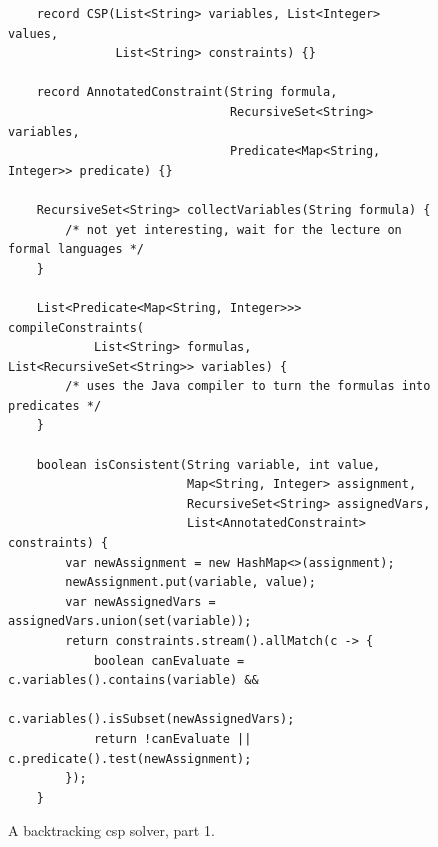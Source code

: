 \begin{figure}[!ht]
\centering
\begin{verbatim}
    record CSP(List<String> variables, List<Integer> values,
               List<String> constraints) {}

    record AnnotatedConstraint(String formula,
                               RecursiveSet<String> variables,
                               Predicate<Map<String, Integer>> predicate) {}
    
    RecursiveSet<String> collectVariables(String formula) {
        /* not yet interesting, wait for the lecture on formal languages */
    }

    List<Predicate<Map<String, Integer>>> compileConstraints(
            List<String> formulas, List<RecursiveSet<String>> variables) {
        /* uses the Java compiler to turn the formulas into predicates */
    }
      
    boolean isConsistent(String variable, int value,
                         Map<String, Integer> assignment,
                         RecursiveSet<String> assignedVars,
                         List<AnnotatedConstraint> constraints) {
        var newAssignment = new HashMap<>(assignment);
        newAssignment.put(variable, value);
        var newAssignedVars = assignedVars.union(set(variable));
        return constraints.stream().allMatch(c -> {
            boolean canEvaluate = c.variables().contains(variable) &&
                                  c.variables().isSubset(newAssignedVars);
            return !canEvaluate || c.predicate().test(newAssignment);
        });
    }
\end{verbatim}
\vspace*{-0.3cm}
\caption{A backtracking \Gls{csp} solver, part 1.}
\label{fig:CSP-Solver.ipynb-1}
\end{figure} %

